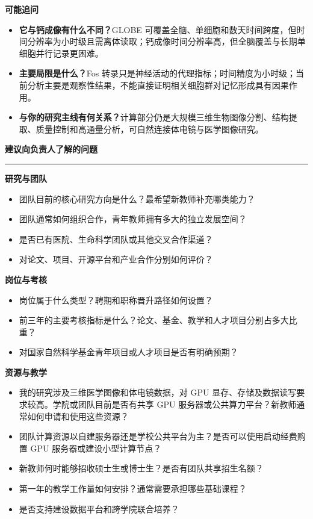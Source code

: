 \documentclass[11pt,a4paper]{ctexart}
\newcommand{\sectionbar}[1]{%
  \vspace{0.35em}
  {\large\bfseries\sffamily\color{accent} #1}\par
  \vspace{-0.35em}\color{accent}\rule{\textwidth}{0.7pt}\color{black}\vspace{0.2em}
}
\newcommand{\prompt}[1]{\textbf{\color{accent}#1}}
\begin{document}
\prompt{可能追问}
\begin{itemize}
  \item \textbf{它与钙成像有什么不同？}GLOBE 可覆盖全脑、单细胞和数天时间跨度，但时间分辨率为小时级且需离体读取；钙成像时间分辨率高，但全脑覆盖与长期单细胞并行记录更困难。
  \item \textbf{主要局限是什么？}Fos 转录只是神经活动的代理指标；时间精度为小时级；当前分析主要是观察性结果，不能直接证明相关细胞群对记忆形成具有因果作用。
  \item \textbf{与你的研究主线有何关系？}计算部分仍是大规模三维生物图像分割、结构提取、质量控制和高通量分析，可自然连接体电镜与医学图像研究。
\end{itemize}

\endgroup

\newpage
\sectionbar{建议向负责人了解的问题}

\begingroup
\small

\prompt{研究与团队}
\begin{itemize}
  \item 团队目前的核心研究方向是什么？最希望新教师补充哪类能力？
  \item 团队通常如何组织合作，青年教师拥有多大的独立发展空间？
  \item 是否已有医院、生命科学团队或其他交叉合作渠道？
  \item 对论文、项目、开源平台和产业合作分别如何评价？
\end{itemize}

\prompt{岗位与考核}
\begin{itemize}
  \item 岗位属于什么类型？聘期和职称晋升路径如何设置？
  \item 前三年的主要考核指标是什么？论文、基金、教学和人才项目分别占多大比重？
  \item 对国家自然科学基金青年项目或人才项目是否有明确预期？
\end{itemize}

\prompt{资源与教学}
\begin{itemize}
  \item 我的研究涉及三维医学图像和体电镜数据，对 GPU 显存、存储及数据读写要求较高。学院或团队目前是否有共享 GPU 服务器或公共算力平台？新教师通常如何申请和使用这些资源？
  \item 团队计算资源以自建服务器还是学校公共平台为主？是否可以使用启动经费购置 GPU 服务器或建设小型计算节点？
  \item 新教师何时能够招收硕士生或博士生？是否有团队共享招生名额？
  \item 第一年的教学工作量如何安排？通常需要承担哪些基础课程？
  \item 是否支持建设数据平台和跨学院联合培养？
\end{itemize}
\end{document}
